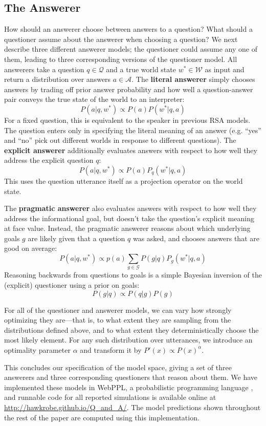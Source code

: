 \documentclass[12pt, floatsintext, man]{apa6}
\begin{document}
\subsection{The Answerer}

How should an answerer choose between answers to a question? What should a questioner assume about the answerer when choosing a question? We next describe three different answerer models; the questioner could assume any one of them, leading to three corresponding versions of the questioner model.
All answerers take a question $q \in \mathcal{Q}$ and a true world state $w^* \in \mathcal{W}$ as input and return a distribution over answers $a \in \mathcal{A}$.
%
The \textbf{literal answerer} simply chooses answers by trading off prior answer probability  and how well a question-answer pair conveys the true state of the world to an interpreter:
%
$$P(a | q,w^*) \propto P(a) P(w^* | q, a) $$
%
For a fixed question, this is equivalent to the speaker in previous RSA models. The question enters only in specifying the literal meaning of an answer (e.g. ``yes'' and ``no'' pick out different worlds in response to different questions).
%
The \textbf{explicit answerer} additionally evaluates answers with respect to how well they address the explicit question $q$:
%
$$P(a | q, w^*) \propto P(a) P_q(w^* | q, a) $$
This uses the question utterance itself as a projection operator on the world state.

The \textbf{pragmatic answerer} also evaluates answers with respect to how well they address the informational goal, but doesn't take the question's explicit meaning at face value. Instead, the pragmatic answerer reasons about which underlying goals $g$ are likely given that a question $q$ was asked, and chooses answers that are good on average:
%
$$
P(a | q, w^*) \propto p(a) \sum_{g \in \mathcal{G}} P(g|q) P_g(w^*|q, a)
$$
Reasoning backwards from questions to goals is a simple Bayesian inversion of the (explicit) questioner using a prior on goals:
$$
P(g|q) \propto P(q|g)P(g)
$$

For all of the questioner and answerer models, we can vary how strongly optimizing they are---that is, to what extent they are sampling from the distributions defined above, and to what extent they deterministically choose the most likely element. For any such distribution over utterances, we introduce an optimality parameter $\alpha$ and transform it by $ P'(x) \propto P(x)^{\alpha} $.
%

This concludes our specification of the model space, giving a set of three answerers and three corresponding questioners that reason about them. We have implemented these models in WebPPL, a probabilistic programming language \cite{GoodmanStuhlmuller14_DIPPL}, and runnable code for all reported simulations is available online at \url{http://hawkrobe.github.io/Q\_and\_A/}. The model predictions shown throughout the rest of the paper are computed using this implementation. 
\end{document}
